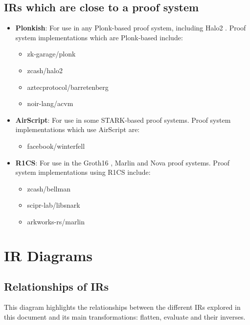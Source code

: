 \documentclass[
    9pt,            %
    techreport,        %
    affiltop,       %
]{art}
\begin{document}
\subsection{IRs which are close to a proof system}
\begin{itemize}
\item \textbf{Plonkish}: For use in any Plonk-based\cite{cryptoeprint:2019/953} proof system, including Halo2 \cite{halo2-repo}. Proof system implementations which are Plonk-based include: 
    \begin{itemize}
        \item zk-garage/plonk 
        \item zcash/halo2 
        \item aztecprotocol/barretenberg 
        \item noir-lang/acvm
    \end{itemize}
\item \textbf{AirScript}: For use in some STARK-based proof systems. Proof system implementations which use AirScript are: 
    \begin{itemize}
        \item facebook/winterfell
    \end{itemize}
\item \textbf{R1CS}: For use in the Groth16 \cite{cryptoeprint:2016/260}, Marlin \cite{cryptoeprint:2019/1047} and Nova \cite{cryptoeprint:2021/370} proof systems. Proof system implementations using R1CS include:
    \begin{itemize}
        \item zcash/bellman
        \item scipr-lab/libsnark 
        \item arkworks-rs/marlin
    \end{itemize}
\end{itemize}

\section{IR Diagrams}

\subsection{Relationships of IRs}

This diagram highlights the relationships between the different IRs explored in this document and its main transformations: flatten, evaluate and their inverses.
\end{document}
